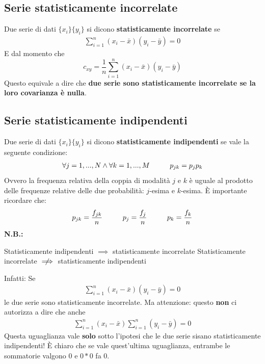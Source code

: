 \subsection{Serie statisticamente incorrelate}
Due serie di dati $\{x_i\} \{y_i\}$ si dicono \textbf{statisticamente incorrelate} se 
\begin{align}
	\sum_{i = 1}^{n} (x_i - \bar{x}) (y_i - \bar{y}) = 0
\end{align}
E dal momento che 
\[
c_{xy} = \frac{1}{n} \sum_{i = 1}^{n}(x_i - \bar{x}) (y_i - \bar{y})
\]
Questo equivale a dire che \textbf{due serie sono statisticamente incorrelate se la loro covarianza è nulla}.

\subsection{Serie statisticamente indipendenti}
Due serie di dati $\{x_i\} \{y_i\}$ si dicono \textbf{statisticamente indipendenti} se vale la seguente condizione:
\begin{align}
	\forall j = 1, ..., N \land \forall k = 1, ..., M \hspace{10mm} p_{jk} = p_j p_k
\end{align} 
Ovvero la frequenza relativa della coppia di modalità $j$ e $k$ è uguale al prodotto delle frequenze relative delle due probabilità: $j$-esima e $k$-esima.
È importante ricordare che:
\[
p_{jk} = \frac{f_{jk}}{n} \hspace{10mm} p_j = \frac{f_j}{n} \hspace{10mm} p_k = \frac{f_k}{n}
\]
\textbf{N.B.:} 
\begin{center}
	Statisticamente indipendenti $\implies$ statisticamente incorrelate
	Statisticamente incorrelate $\centernot\implies$ statisticamente  indipendenti
\end{center}
Infatti: \newline
Se 
\begin{align}
	\sum_{i = 1}^{n} (x_i - \bar{x}) (y_i - \bar{y}) = 0
\end{align}
le due serie sono statisticamente incorrelate. Ma attenzione: questo \textbf{non} ci autorizza a dire che anche 
\begin{align}
	\sum_{i = 1}^{n} (x_i - \bar{x}) \sum_{i = 1}^{n} (y_i - \bar{y}) = 0
\end{align}
Questa uguaglianza vale \textbf{solo} sotto l'ipotesi che le due serie sisano statisticamente indipendenti!
È chiaro che se vale quest'ultima uguaglianza, entrambe le sommatorie valgono 0 e $0*0$ fa 0.
